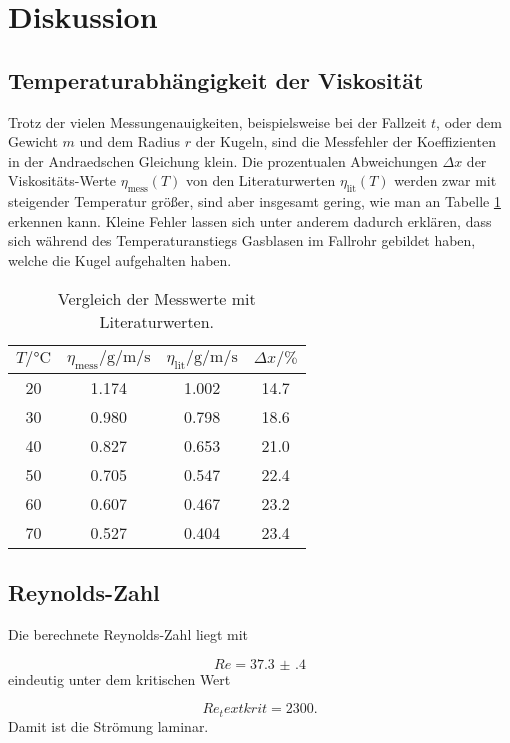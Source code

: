 \section{Diskussion}
\label{sec:Diskussion}

\subsection{Temperaturabhängigkeit der Viskosität}

Trotz der vielen Messungenauigkeiten, beispielsweise bei der Fallzeit $t$, oder
dem Gewicht $m$ und dem Radius $r$ der Kugeln, sind die Messfehler der
Koeffizienten in der Andraedschen Gleichung klein.
Die prozentualen Abweichungen $\Delta x$ der Viskositäts-Werte
$\eta_\text{mess}(T)$ von den
Literaturwerten $\eta_\text{lit}(T)$ \cite{Viskositätliteratur}
werden zwar mit steigender Temperatur größer,
sind aber insgesamt gering,
wie man an Tabelle \ref{tab:VglTemperatur} erkennen kann.
Kleine Fehler lassen sich unter anderem dadurch erklären, dass sich während des
Temperaturanstiegs Gasblasen im Fallrohr gebildet haben, welche die Kugel
aufgehalten haben.

\begin{table}[h]
  \centering
  \caption{Vergleich der Messwerte mit Literaturwerten.}
  \label{tab:VglTemperatur}
  \begin{tabular}{c c c c}
    \toprule
    $T/\si{\celsius}$ & $\eta_\text{mess}/\si{\gram\per\meter\per\second}$ &
    $\eta_\text{lit}/\si{\gram\per\meter\per\second}$ &
    $\Delta x/\si{\percent}$ \\
    \midrule
    20 & 1.174 & 1.002 & 14.7 \\
    30 & 0.980 & 0.798 & 18.6 \\
    40 & 0.827 & 0.653 & 21.0 \\
    50 & 0.705 & 0.547 & 22.4 \\
    60 & 0.607 & 0.467 & 23.2 \\
    70 & 0.527 & 0.404 & 23.4 \\
    \bottomrule
  \end{tabular}
\end{table}


\subsection{Reynolds-Zahl}

Die berechnete Reynolds-Zahl liegt mit

\begin{equation}
  Re = \num{37.3(4)}
\end{equation}
eindeutig unter dem kritischen Wert

\begin{equation}
  Re_text{krit} = 2300.
\end{equation}
Damit ist die Strömung laminar.
